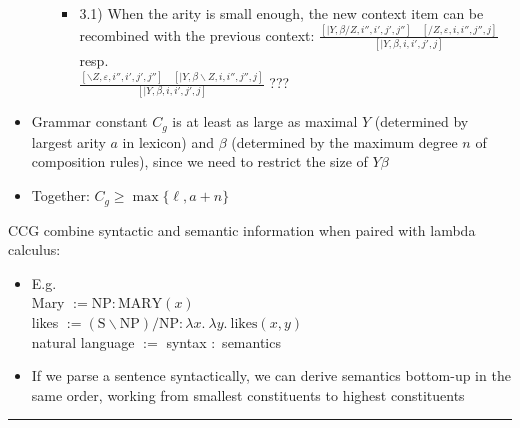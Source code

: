 \begin{itemize}
\begin{itemize}
\begin{itemize}
            \item 3.1) When the arity is small enough, the new context item can be recombined with the previous context:
            $
            \frac{[\mid Y, \beta / Z, i'', i', j', j''] \quad [/ Z, \varepsilon, i, i'', j'', j]}{[\mid Y, \beta, i, i', j', j]}
            $\\
            resp.\\
            $
            \frac{[\backslash Z, \varepsilon, i'', i', j', j''] \quad [\mid Y, \beta \backslash Z, i, i'', j'', j]}{[\mid Y, \beta, i, i', j', j]}
            $ ???
        \end{itemize}
    \end{itemize}
    \item Grammar constant $C_g$ is at least as large as maximal $Y$ (determined by largest arity $a$ in lexicon) and $\beta$ (determined by the maximum degree $n$ of composition rules), since we need to restrict the size of $Y \beta$
    \item Together: $C_g \geq \max \{ \ell, a + n \}$
\end{itemize}
CCG combine syntactic and semantic information when paired with lambda calculus:
\begin{itemize}
    \item E.g.\\
    Mary $:= \textrm{NP} : \textrm{MARY}(x)$\\
    likes $:= (\textrm{S} \backslash \textrm{NP}) / \textrm{NP} : \lambda x.\ \lambda y.\ \textrm{likes}(x, y)$\\
    natural language $:=$ syntax $:$ semantics
    \item If we parse a sentence syntactically, we can derive semantics bottom-up in the same order, working from smallest constituents to highest constituents
\end{itemize}

{\color{black}\hrule height 0.001mm}

